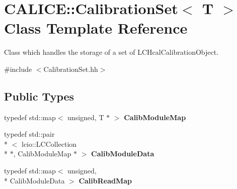 \section{C\-A\-L\-I\-C\-E\-:\-:Calibration\-Set$<$ T $>$ Class Template Reference}
\label{classCALICE_1_1CalibrationSet}


Class which handles the storage of a set of L\-C\-Hcal\-Calibration\-Object.  




{\ttfamily \#include $<$Calibration\-Set.\-hh$>$}

\subsection*{Public Types}
\begin{DoxyCompactItemize}
\item 
typedef std\-::map$<$ unsigned, T $\ast$ $>$ {\bfseries Calib\-Module\-Map}\label{classCALICE_1_1CalibrationSet_ae0ef8d231d149d1e61a4000952d58d67}

\item 
typedef std\-::pair\\*
$<$ lcio\-::\-L\-C\-Collection \\*
$\ast$, Calib\-Module\-Map $\ast$ $>$ {\bfseries Calib\-Module\-Data}\label{classCALICE_1_1CalibrationSet_a894d8c42a35b66022bb221db4585f5f5}

\item 
typedef std\-::map$<$ unsigned, \\*
Calib\-Module\-Data $>$ {\bfseries Calib\-Read\-Map}\label{classCALICE_1_1CalibrationSet_a6f4a5967aa3a3ad50d763a92809fcf60}

\end{DoxyCompactItemize}
